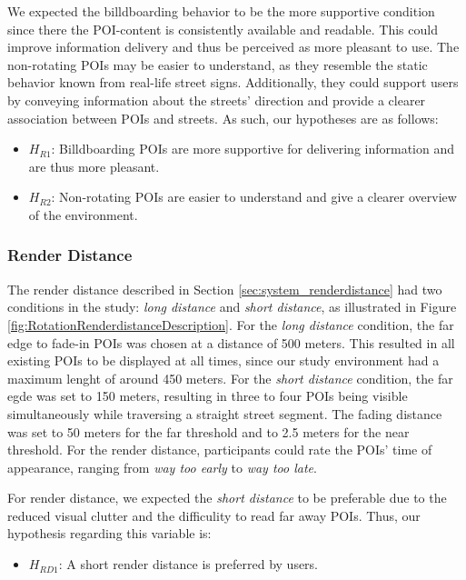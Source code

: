 We expected the billdboarding behavior to be the more supportive condition since there the POI-content is consistently available and readable. This could improve information delivery and thus be perceived as more pleasant to use. The non-rotating POIs may be easier to understand, as they resemble the static behavior known from real-life street signs. Additionally, they could support users by conveying information about the streets' direction and provide a clearer association between POIs and streets. As such, our hypotheses are as follows:
\begin{itemize}
    \item $H_{R1}$: Billdboarding POIs are more supportive for delivering information and are thus more pleasant.
    \item $H_{R2}$: Non-rotating POIs are easier to understand and give a clearer overview of the environment.
\end{itemize}


\subsubsection*{\textbf{Render Distance}}
The render distance described in Section \ref{sec:system_renderdistance} had two conditions in the study: \textit{long distance} and \textit{short distance}, as illustrated in Figure \ref{fig:RotationRenderdistanceDescription}. For the \textit{long distance} condition, the far edge to fade-in POIs was chosen at a distance of 500 meters. This resulted in all existing POIs to be displayed at all times, since our study environment had a maximum lenght of around 450 meters. For the \textit{short distance} condition, the far egde was set to 150 meters, resulting in three to four POIs being visible simultaneously while traversing a straight street segment. The fading distance was set to 50 meters for the far threshold and to 2.5 meters for the near threshold. For the render distance, participants could rate the POIs' time of appearance, ranging from \textit{way too early} to \textit{way too late}.

For render distance, we expected the \textit{short distance} to be preferable due to the reduced visual clutter and the difficulity to read far away POIs. Thus, our hypothesis regarding this variable is:
\begin{itemize}
    \item $H_{RD1}$: A short render distance is preferred by users.
\end{itemize}


